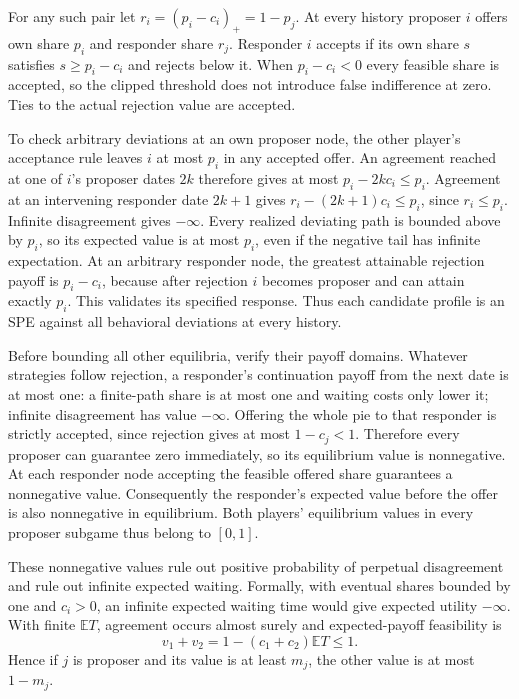 \documentclass[11pt]{article}
\newcommand{\E}{\mathbb E}
\newcommand{\pos}[1]{\left(#1\right)_{+}}
\begin{document}
For any such pair let $r_i=\pos{p_i-c_i}=1-p_j$. At every history proposer $i$ offers own share $p_i$ and responder share $r_j$. Responder $i$ accepts if its own share $s$ satisfies $s\ge p_i-c_i$ and rejects below it. When $p_i-c_i<0$ every feasible share is accepted, so the clipped threshold does not introduce false indifference at zero. Ties to the actual rejection value are accepted.

To check arbitrary deviations at an own proposer node, the other player's acceptance rule leaves $i$ at most $p_i$ in any accepted offer. An agreement reached at one of $i$'s proposer dates $2k$ therefore gives at most $p_i-2kc_i\le p_i$. Agreement at an intervening responder date $2k+1$ gives $r_i-(2k+1)c_i\le p_i$, since $r_i\le p_i$. Infinite disagreement gives $-\infty$. Every realized deviating path is bounded above by $p_i$, so its expected value is at most $p_i$, even if the negative tail has infinite expectation. At an arbitrary responder node, the greatest attainable rejection payoff is $p_i-c_i$, because after rejection $i$ becomes proposer and can attain exactly $p_i$. This validates its specified response. Thus each candidate profile is an SPE against all behavioral deviations at every history.

Before bounding all other equilibria, verify their payoff domains. Whatever strategies follow rejection, a responder's continuation payoff from the next date is at most one: a finite-path share is at most one and waiting costs only lower it; infinite disagreement has value $-\infty$. Offering the whole pie to that responder is strictly accepted, since rejection gives at most $1-c_j<1$. Therefore every proposer can guarantee zero immediately, so its equilibrium value is nonnegative. At each responder node accepting the feasible offered share guarantees a nonnegative value. Consequently the responder's expected value before the offer is also nonnegative in equilibrium. Both players' equilibrium values in every proposer subgame thus belong to $[0,1]$.

These nonnegative values rule out positive probability of perpetual disagreement and rule out infinite expected waiting. Formally, with eventual shares bounded by one and $c_i>0$, an infinite expected waiting time would give expected utility $-\infty$. With finite $\E T$, agreement occurs almost surely and expected-payoff feasibility is
\begin{equation}\label{eq:addfeasible}
 v_1+v_2=1-(c_1+c_2)\E T\le1.
\end{equation}
Hence if $j$ is proposer and its value is at least $m_j$, the other value is at most $1-m_j$.
\end{document}
